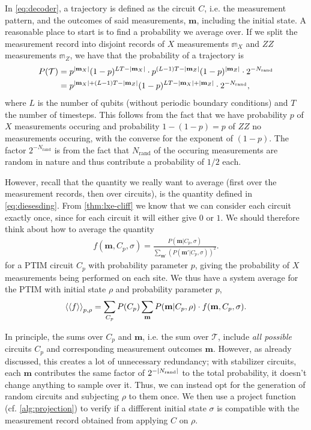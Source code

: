 In \cref{eq:decoder}, a trajectory is defined as the circuit $C$, i.e. the measurement pattern,
and the outcomes of said measurements, $\mathbf{m}$, including the initial
state. A reasonable place to start is to find a probability we average over.
If we split the measurement record into disjoint records of $X$
measurements $\mathbb{m}_X$ and $ZZ$ measurements $\mathbb{m}_Z$, we have that
the probability of a trajectory is
\begin{align}
      P(\mathcal{T}) &=
      p^{\abs{\mathbf{m}_X}}(1-p)^{LT-\abs{\mathbf{m}_X}}\cdot
      p^{(L-1)T-\abs{\mathbf{m}_Z}}(1-p)^{\abs{\mathbf{m}_Z}}\cdot
      2^{-N_\mathrm{rand}} \nonumber\\ &= 
      p^{\abs{\mathbf{m}_X}+(L-1)T-\abs{\mathbf{m}_Z}}(1-p)^{LT-\abs{\mathbf{m}_X}+\abs{\mathbf{m}_Z}}\cdot2^{-N_\mathrm{rand}}
,\end{align}
where $L$ is the number of qubits (without periodic boundary conditions) and
$T$ the number of timesteps. This follows from the fact that we have
probability $p$ of $X$ measurements occuring and probability $1-(1-p) = p$ of
$ZZ$ no measurements occuring, with the converse for the exponent of $(1-p)$.
The factor $2^{-N_\mathrm{rand}}$ is from the fact that $N_\mathrm{rand}$ of
the occuring measurements are random in nature and thus contribute a
probability of $1 /2$ each.

However, recall that the quantity we really want to average (first over the
measurement records, then over circuits), is the quantity defined in
\cref{eq:diesesding}. From \cref{thm:lxe-cliff} we know that we can consider
each circuit exactly once, since for each circuit it will either give $0$ or
$1$. We should therefore think about how to average the quantity
\begin{align}
      f(\mathbf{m}, C_p, \sigma) = \frac{P(\mathbf{m} |
     C_p,\sigma)}{\sum_{\mathbf{m'}}\left(P(\mathbf{m}'|C_p,\sigma)\right)^2}
.\end{align}
for a PTIM circuit $C_p$ with probability parameter $p$, giving the probability
of $X$ measurements being performed on each site. We thus have a system average
for the PTIM with initial state $\rho$ and probability parameter $p$,
\begin{align}
      \expval{\expval{f}}_{p,\rho} = \sum_{C_p} P(C_p) \sum_\mathbf{m}
      P(\mathbf{m} |C_p,\rho)\cdot f(\mathbf{m},C_p, \sigma)
.\end{align}

In principle, the sums over $C_p$ and $\mathbf{m}$, i.e. the sum over
$\mathcal{T}$, include \emph{all possible} circuits $C_p$ and
corresponding measurement outcomes $\mathbf{m}$. However, as already discussed,
this creates a lot of unnecessary redundancy; with stabilizer circuits, each
$\mathbf{m}$ contributes 
the same factor of
$2^{-\abs{N_\mathrm{rand}}}$ to the total probability, it doesn't change
anything to sample over it. Thus, we can instead opt for the generation of
random circuits and subjecting $\rho$ to them once. We then use a project
function (cf. \cref{alg:projection}) to verify if a diffferent initial state
$\sigma$ is compatible with the measurement record obtained from applying $C$
on $\rho$.

